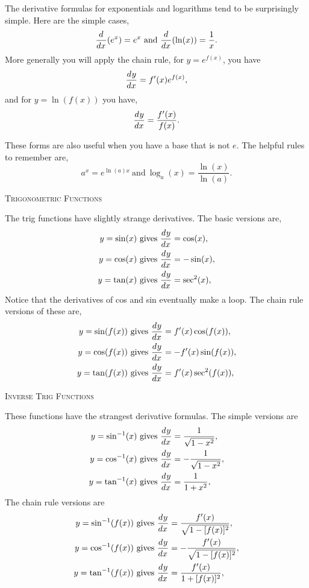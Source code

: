 \documentclass[a4paper,10pt]{article}
\newcommand{\deriv}[3][ ]{\ensuremath\frac{d^{#1}#2}{d#3^{#1}}}
\newcommand{\derivof}[2][ ]{\ensuremath\frac{d^{#1}}{d#2^{#1}}}
\begin{document}
\begin{multicols*}{2}
The derivative formulas for exponentials and logarithms tend to be 
surprisingly simple. Here are the simple cases, 
$$\derivof{x}(e^x) = e^x \textrm{~and~} \derivof{x}(\ln(x)) = \frac{1}{x}.$$
More generally you will apply the chain rule, for $y = e^{f(x)}$, you have 
$$\deriv{y}{x} = f'(x)e^{f(x)},$$
and for $y = \ln(f(x))$ you have,
$$\deriv{y}{x} = \frac{f'(x)}{f(x)}.$$

These forms are also useful when you have a base that is not $e$. 
The helpful rules to remember are,
$$a^x = e^{\ln(a)x} \mathrm{~and~} \log_a(x) = \frac{\ln(x)}{\ln(a)}.$$

{\large\textsc{Trigonometric Functions}}

The trig functions have slightly strange derivatives. The basic versions are,
\begin{align*}
y = \sin(x) &\mathrm{~gives~} \deriv{y}{x} = \cos(x), \\
y = \cos(x) &\mathrm{~gives~} \deriv{y}{x} = -\sin(x), \\
y = \tan(x) &\mathrm{~gives~} \deriv{y}{x} = \sec^2(x), \\
\end{align*}
Notice that the derivatives of cos and sin eventually make a loop. 
The chain rule versions of these are,
\begin{align*}
y = \sin(f(x)) &\mathrm{~gives~} \deriv{y}{x} = f'(x)\cos(f(x)), \\
y = \cos(f(x)) &\mathrm{~gives~} \deriv{y}{x} = -f'(x)\sin(f(x)), \\
y = \tan(f(x)) &\mathrm{~gives~} \deriv{y}{x} = f'(x)\sec^2(f(x)), \\
\end{align*}

{\large\textsc{Inverse Trig Functions}}

These functions have the strangest derivative formulas. The simple versions 
are 
\begin{align*}
y = \sin^{-1}(x) &\mathrm{~gives~} \deriv{y}{x} = \frac{1}{\sqrt{1-x^2}}, \\
y = \cos^{-1}(x) &\mathrm{~gives~} \deriv{y}{x} = -\frac{1}{\sqrt{1-x^2}}, \\
y = \tan^{-1}(x) &\mathrm{~gives~} \deriv{y}{x} = \frac{1}{1+x^2}, \\
\end{align*}
The chain rule versions are
\begin{align*}
y = \sin^{-1}(f(x)) &\mathrm{~gives~} \deriv{y}{x} = \frac{f'(x)}{\sqrt{1-[f(x)]^2}}, \\
y = \cos^{-1}(f(x)) &\mathrm{~gives~} \deriv{y}{x} = -\frac{f'(x)}{\sqrt{1-[f(x)]^2}}, \\
y = \tan^{-1}(f(x)) &\mathrm{~gives~} \deriv{y}{x} = \frac{f'(x)}{1+[f(x)]^2}, \\
\end{align*}

\end{multicols*}
\end{document}
